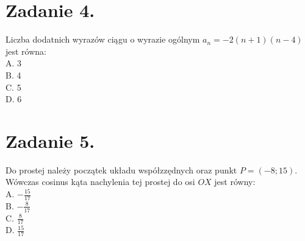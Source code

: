 \documentclass[10pt]{article}
\begin{document}
\section*{Zadanie 4.}
Liczba dodatnich wyrazów ciągu o wyrazie ogólnym \(a_{n}=-2(n+1)(n-4)\) jest równa:\\
A. 3\\
B. 4\\
C. 5\\
D. 6

\section*{Zadanie 5.}
Do prostej należy początek układu współzzędnych oraz punkt \(P=(-8 ; 15)\). Wówczas cosinus kąta nachylenia tej prostej do osi \(O X\) jest równy:\\
A. \(-\frac{15}{17}\)\\
B. \(-\frac{8}{17}\)\\
C. \(\frac{8}{17}\)\\
D. \(\frac{15}{17}\)
\end{document}
